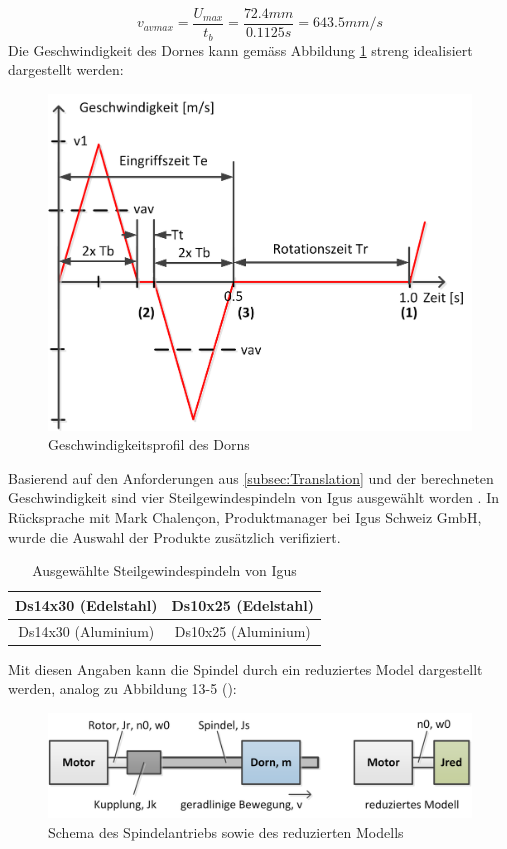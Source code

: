\begin{equation}
v_{avmax}=\frac{U_{max}}{t_{b}}=\frac{72.4mm}{0.1125s}=643.5mm/s
\end{equation}
\newpage
Die Geschwindigkeit des Dornes kann  gemäss Abbildung \ref{fig:vprofil_dorn} streng idealisiert dargestellt werden:
	\begin{figure}[H]
	\includegraphics[width=1\textwidth]{Illustrationen/6-Umsetzung/vprofil_dorn.png}
	\caption{Geschwindigkeitsprofil des Dorns}
	\label{fig:vprofil_dorn}
\end{figure}
Basierend auf den Anforderungen aus \ref{subsec:Translation} und der berechneten Geschwindigkeit sind vier Steilgewindespindeln von Igus ausgewählt worden \cite{igusDryspin}. In Rücksprache mit Mark Chalençon, Produktmanager bei Igus Schweiz GmbH, wurde die Auswahl der Produkte zusätzlich verifiziert. 
\begin{table}[H]
\begin{tabular}{|c|c|}
	\hline 
	Ds14x30 (Edelstahl) & Ds10x25 (Edelstahl) \\ 
	\hline 
	Ds14x30 (Aluminium) & Ds10x25 (Aluminium) \\ 
	\hline 
\end{tabular} 
\caption{Ausgewählte Steilgewindespindeln von Igus}
\label{tab:spindeln}
\end{table}
Mit diesen Angaben kann die Spindel durch ein reduziertes Model dargestellt werden, analog zu Abbildung 13-5 ():
 	\begin{figure}[H]
 	\includegraphics[width=1\textwidth]{Illustrationen/6-Umsetzung/red_modell.png}
 	\caption{Schema des Spindelantriebs sowie des reduzierten Modells}
 	\label{fig:red_modell}
	\end{figure}
